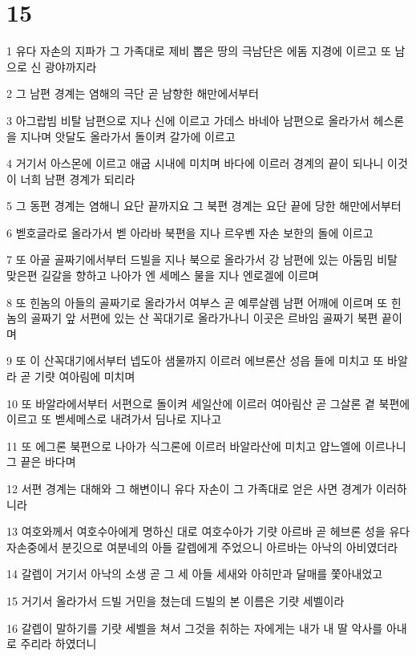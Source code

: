 \chapter{15}

\par 1 유다 자손의 지파가 그 가족대로 제비 뽑은 땅의 극남단은 에돔 지경에 이르고 또 남으로 신 광야까지라
\par 2 그 남편 경계는 염해의 극단 곧 남향한 해만에서부터
\par 3 아그랍빔 비탈 남편으로 지나 신에 이르고 가데스 바네아 남편으로 올라가서 헤스론을 지나며 앗달도 올라가서 돌이켜 갈가에 이르고
\par 4 거기서 아스몬에 이르고 애굽 시내에 미치며 바다에 이르러 경계의 끝이 되나니 이것이 너희 남편 경계가 되리라
\par 5 그 동편 경계는 염해니 요단 끝까지요 그 북편 경계는 요단 끝에 당한 해만에서부터
\par 6 벧호글라로 올라가서 벧 아라바 북편을 지나 르우벤 자손 보한의 돌에 이르고
\par 7 또 아골 골짜기에서부터 드빌을 지나 북으로 올라가서 강 남편에 있는 아둠밈 비탈 맞은편 길갈을 향하고 나아가 엔 세메스 물을 지나 엔로겔에 이르며
\par 8 또 힌놈의 아들의 골짜기로 올라가서 여부스 곧 예루살렘 남편 어깨에 이르며 또 힌놈의 골짜기 앞 서편에 있는 산 꼭대기로 올라가나니 이곳은 르바임 골짜기 북편 끝이며
\par 9 또 이 산꼭대기에서부터 넵도아 샘물까지 이르러 에브론산 성읍 들에 미치고 또 바알라 곧 기럇 여아림에 미치며
\par 10 또 바알라에서부터 서편으로 돌이켜 세일산에 이르러 여아림산 곧 그살론 곁 북편에 이르고 또 벧세메스로 내려가서 딤나로 지나고
\par 11 또 에그론 북편으로 나아가 식그론에 이르러 바알라산에 미치고 얍느엘에 이르나니 그 끝은 바다며
\par 12 서편 경계는 대해와 그 해변이니 유다 자손이 그 가족대로 얻은 사면 경계가 이러하니라
\par 13 여호와께서 여호수아에게 명하신 대로 여호수아가 기럇 아르바 곧 헤브론 성을 유다 자손중에서 분깃으로 여분네의 아들 갈렙에게 주었으니 아르바는 아낙의 아비였더라
\par 14 갈렙이 거기서 아낙의 소생 곧 그 세 아들 세새와 아히만과 달매를 쫓아내었고
\par 15 거기서 올라가서 드빌 거민을 쳤는데 드빌의 본 이름은 기럇 세벨이라
\par 16 갈렙이 말하기를 기럇 세벨을 쳐서 그것을 취하는 자에게는 내가 내 딸 악사를 아내로 주리라 하였더니
